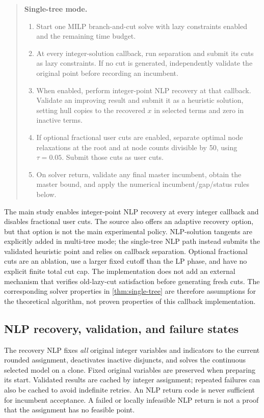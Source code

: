 \begin{quote}
\textbf{Single-tree mode.}
\begin{enumerate}
 \item Start one MILP branch-and-cut solve with lazy constraints enabled and the remaining time budget.
 \item At every integer-solution callback, run separation and submit its cuts as lazy constraints. If no cut is generated, independently validate the original point before recording an incumbent.
 \item When enabled, perform integer-point NLP recovery at that callback. Validate an improving result and submit it as a heuristic solution, setting hull copies to the recovered $x$ in selected terms and zero in inactive terms.
 \item If optional fractional user cuts are enabled, separate optimal node relaxations at the root and at node counts divisible by 50, using $\tau=0.05$. Submit those cuts as user cuts.
 \item On solver return, validate any final master incumbent, obtain the master bound, and apply the numerical incumbent/gap/status rules below.
\end{enumerate}
\end{quote}
The main study enables integer-point NLP recovery at every integer callback and disables fractional user cuts. The source also offers an adaptive recovery option, but that option is not the main experimental policy. NLP-solution tangents are explicitly added in multi-tree mode; the single-tree NLP path instead submits the validated heuristic point and relies on callback separation. Optional fractional cuts are an ablation, use a larger fixed cutoff than the LP phase, and have no explicit finite total cut cap. The implementation does not add an external mechanism that verifies old-lazy-cut satisfaction before generating fresh cuts. The corresponding solver properties in \cref{thm:single-tree} are therefore assumptions for the theoretical algorithm, not proven properties of this callback implementation.

\subsection{NLP recovery, validation, and failure states}
The recovery NLP fixes \emph{all} original integer variables and indicators to the current rounded assignment, deactivates inactive disjuncts, and solves the continuous selected model on a clone. Fixed original variables are preserved when preparing its start. Validated results are cached by integer assignment; repeated failures can also be cached to avoid indefinite retries. An NLP return code is never sufficient for incumbent acceptance. A failed or locally infeasible NLP return is not a proof that the assignment has no feasible point.

